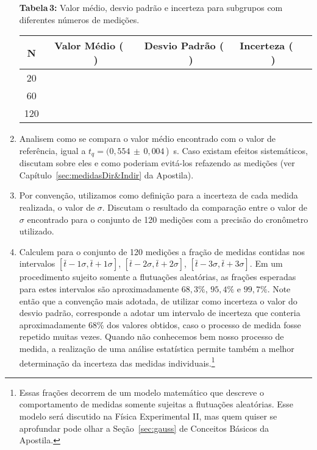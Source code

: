 \begin{enumerate}
\begin{center}
{{\bf Tabela\,3:} Valor médio, desvio padrão e incerteza para subgrupos com diferentes números de medições.}

  \begin{tabular}{|c|c|c|c|} \hline
  \bf N & \bf Valor Médio ($\;\;\;\;\;$)& \bf Desvio Padrão ($\;\;\;\;\;$) &  \bf Incerteza ($\;\;\;\;\;$)\\ \hline
   20 & & & \\ \hline
   60 & & & \\ \hline
  120 & & & \\ \hline
\end{tabular}
\label{tab:2060120med}
\end{center}

\item Analisem como se compara o valor médio encontrado com o valor de referência, igual a $t_{q}= (0,554\,\pm\,0,004\,$)~s.  Caso existam efeitos sistemáticos, discutam sobre eles e como poderiam evitá-los refazendo as medições (ver Capítulo~\ref{sec:medidasDir&Indir}  da Apostila).

\item Por convenção, utilizamos como definição para a incerteza de cada medida realizada, o valor de $\sigma$. Discutam o resultado da comparação entre o valor de $\sigma$ encontrado para o conjunto de 120 medições com a precisão do cronômetro utilizado.  

\item Calculem para o conjunto de 120 medições a fração de medidas contidas nos intervalos $[\bar{t}-1\sigma, \bar{t}+1\sigma]$, 
$[\bar{t}-2\sigma, \bar{t}+2\sigma]$, $[\bar{t}-3\sigma, \bar{t}+3 \sigma]$.  Em um procedimento sujeito somente a flutuações aleatórias, as frações esperadas para estes intervalos são aproximadamente $68,3\%$, $95,4\%$ e $99,7\%$. Note então que a convenção mais adotada, de utilizar como incerteza o valor do desvio padrão, corresponde a adotar um intervalo de incerteza que conteria aproximadamente $68\%$ dos valores obtidos, caso o processo de medida fosse repetido muitas vezes. Quando não conhecemos bem nosso processo de medida, a realização de uma análise estatística permite também a melhor determinação da incerteza das medidas individuais.\footnote{Essas frações decorrem de um modelo matemático que descreve o comportamento de medidas somente sujeitas a flutuações aleatórias. Esse modelo será discutido na Física Experimental II, mas quem quiser se aprofundar pode olhar a Seção~\ref{sec:gauss} %
de Conceitos Básicos da Apostila.} 
\end{enumerate}

